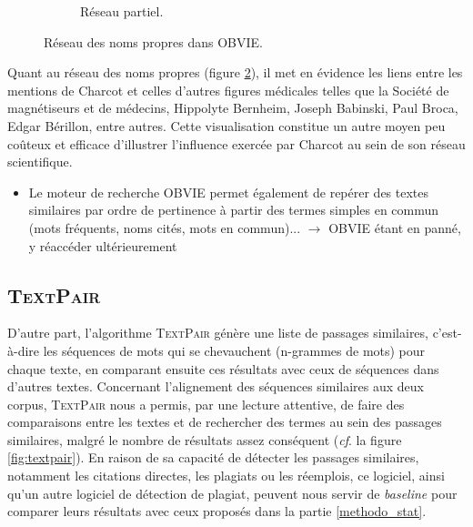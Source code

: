 \begin{figure}[h]
\begin{subfigure}{.53\textwidth}
		\caption{Réseau partiel.}
		\label{fig:reseau_noms_propres_mini}
	\end{subfigure}
	\caption{Réseau des noms propres dans \textsc{OBVIE}.}
	\label{fig:reseaux_noms_propres}
\end{figure}

Quant au réseau des noms propres (figure \ref{fig:reseaux_noms_propres}), il met en évidence les liens entre les mentions de Charcot et celles d'autres figures médicales telles que la Société de magnétiseurs et de médecins, Hippolyte Bernheim, Joseph Babinski, Paul Broca, Edgar Bérillon, entre autres. Cette visualisation constitue un autre moyen peu coûteux et efficace d'illustrer l'influence exercée par Charcot au sein de son réseau scientifique.

\begin{tcolorbox}[colback=yellow!10!white,colframe=red!75!black,title=agenda]
	\begin{itemize}
		\item Le moteur de recherche \textsc{OBVIE} permet également de repérer des textes similaires par ordre de pertinence à partir des termes simples en commun (mots fréquents, noms cités, mots en commun)... $\rightarrow$ OBVIE étant en panné, y réaccéder ultérieurement

		
	\end{itemize}
\end{tcolorbox}














\subsection{\textsc{TextPair}}

D'autre part, l'algorithme \textsc{TextPair} génère une liste de passages similaires, c'est-à-dire les séquences de mots qui se chevauchent (n-grammes de mots) pour chaque texte, en comparant ensuite ces résultats avec ceux de séquences dans d'autres textes. Concernant l'alignement des séquences similaires aux deux corpus, \textsc{TextPair} nous a permis, par une lecture attentive, de faire des comparaisons entre les textes et de rechercher des termes au sein des passages similaires, malgré le nombre de résultats assez conséquent (\textit{cf}. la figure \ref{fig:textpair}). En raison de sa capacité de détecter les passages similaires, notamment les citations directes, les plagiats ou les réemplois, ce logiciel, ainsi qu'un autre logiciel de détection de plagiat, peuvent nous servir de \textit{baseline} pour comparer leurs résultats avec ceux proposés dans la partie \ref{methodo_stat}.



